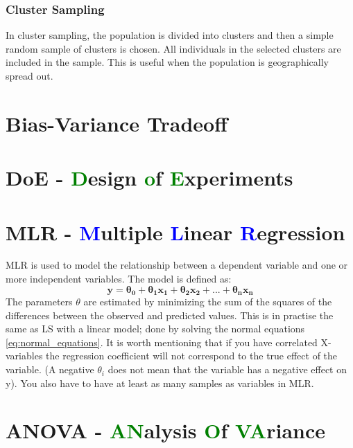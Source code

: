 \subsubsection{Cluster Sampling}
In cluster sampling, the population is divided into clusters and then a simple random sample of clusters is chosen. All individuals in the selected clusters are included in the sample. This is useful when the population is geographically spread out. \newline


\section{Bias-Variance Tradeoff}


\section{DoE - \textcolor{green}{D}esign \textcolor{green}{o}f \textcolor{green}{E}xperiments}

\section{MLR - \textcolor{blue}{M}ultiple \textcolor{blue}{L}inear \textcolor{blue}{R}egression}
MLR is used to model the relationship between a dependent variable and one or more independent variables. The model is defined as:
\begin{equation}
    \mathbf{
    y = \theta_0 + \theta_1x_1 + \theta_2x_2 + ... + \theta_nx_n
    }
\end{equation}
The parameters $\theta$ are estimated by minimizing the sum of the squares of the differences between the observed and predicted values. This is in practise the same as LS with a linear model; done by solving the normal equations \ref{eq:normal_equations}.
It is worth mentioning that if you have correlated X-variables the regression coefficient will not correspond to the true effect of the variable. (A negative $\theta_i$ does not mean that the variable has a negative effect on  y). You also have to have at least as many samples as variables in MLR. \newline

\section{ANOVA - \textcolor{green}{AN}alysis \textcolor{green}{O}f \textcolor{green}{VA}riance}

